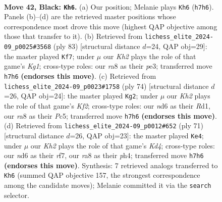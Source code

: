 \documentclass[11pt]{article}
\begin{document}
\clearpage

\begin{figure}[p]\centering
\begin{subfigure}{0.46\textwidth}\centering
\resizebox{\linewidth}{!}{%
\newchessgame
\chessboard[
  setfen={R7/6pk/3Npp2/1p5p/3P1P1P/1r2P1PK/8/8 b - - 5 42},
  showmover=false,
  pgfstyle=straightmove, color=movearrow, markmove={h7-h6}
]}
\caption{}
\end{subfigure}\hfill
\begin{subfigure}{0.46\textwidth}\centering
\resizebox{\linewidth}{!}{%
\newchessgame
\chessboard[
  setfen={6k1/r5p1/7p/3p3P/6P1/pP2PPK1/P1N5/8 b - - 0 42},
  showmover=false,
  pgfstyle=straightmove, color=movearrow, markmove={g8-f7}
]}
\caption{}
\end{subfigure}
\\[4pt]
\begin{subfigure}{0.46\textwidth}\centering
\resizebox{\linewidth}{!}{%
\newchessgame
\chessboard[
  setfen={8/1p3k2/p1p3p1/2P2pP1/1P3P1P/3p3r/5K2/3R4 w - - 0 38},
  showmover=false,
  pgfstyle=straightmove, color=movearrow, markmove={f2-g2}
]}
\caption{}
\end{subfigure}\hfill
\begin{subfigure}{0.46\textwidth}\centering
\resizebox{\linewidth}{!}{%
\newchessgame
\chessboard[
  setfen={8/1p3R2/4p1p1/p2k3p/P2p1P1P/1r4P1/5PK1/8 b - - 0 36},
  showmover=false,
  pgfstyle=straightmove, color=movearrow, markmove={d5-e4}
]}
\caption{}
\end{subfigure}
\caption{\textbf{Move 42, Black: \texttt{Kh6}.} (a) Our position; Melanie plays \texttt{Kh6} (\texttt{h7h6}). Panels (b)--(d) are the retrieved master positions whose correspondence most drove this move (highest QAP objective among those that transfer to it). (b) Retrieved from \texttt{lichess\_elite\_2024-09\_p0025\#3568} (ply 83) [structural distance $d$=24, QAP obj=29]: the master played \texttt{Kf7}; under $\mu$ our \emph{Kh2} plays the role of that game's \emph{Kg1}; cross-type roles: our \emph{r}a8 as their \emph{p}e3; transferred move \texttt{h7h6} \textbf{(endorses this move)}. (c) Retrieved from \texttt{lichess\_elite\_2024-09\_p0023\#1758} (ply 74) [structural distance $d$=26, QAP obj=24]: the master played \texttt{Kg2}; under $\mu$ our \emph{Kh2} plays the role of that game's \emph{Kf2}; cross-type roles: our \emph{n}d6 as their \emph{R}d1, our \emph{r}a8 as their \emph{P}c5; transferred move \texttt{h7h6} \textbf{(endorses this move)}. (d) Retrieved from \texttt{lichess\_elite\_2024-09\_p0012\#652} (ply 71) [structural distance $d$=26, QAP obj=23]: the master played \texttt{Ke4}; under $\mu$ our \emph{Kh2} plays the role of that game's \emph{Kd4}; cross-type roles: our \emph{n}d6 as their \emph{r}f7, our \emph{r}a8 as their \emph{p}h4; transferred move \texttt{h7h6} \textbf{(endorses this move)}. Synthesis: 7 retrieved analogs transferred to \texttt{Kh6} (summed QAP objective 157, the strongest correspondence among the candidate moves); Melanie committed it via the \texttt{search} selector.}
\label{fig:thought-m83}
\end{figure}
\end{document}
